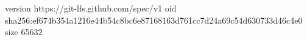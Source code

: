 version https://git-lfs.github.com/spec/v1
oid sha256:ef674b354a1216e44b54c8bc6e87168163d761cc7d24a69c54d630733d46c4e0
size 65632
